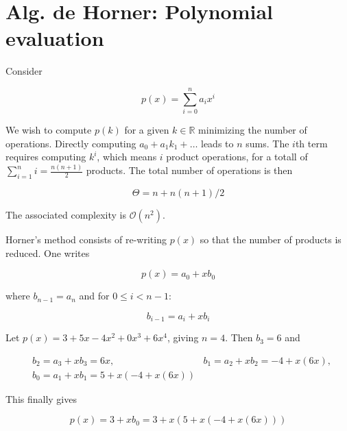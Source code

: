\documentclass[12pt]{article}
\theoremstyle{definition}
\begin{document}
\pagebreak

\section{Alg. de Horner: Polynomial evaluation} 

Consider 

\begin{equation*}
    p(x) = \sum_{i=0}^n a_ix^i
\end{equation*}

We wish to compute $p(k)$ for a given $k \in \mathbb{R}$ minimizing the number
of operations. Directly computing $a_0 + a_1k_1 + \ldots$ leads to $n$ sums. The
$i$th term requires computing $k^i$, which means $i$ product operations, for a
totall of $\sum_{i=1}^n i = \frac{n(n+1)}{2}$ products.  The total number of
operations is then 

\begin{equation*}
    \Theta = n + n(n+1) / 2
\end{equation*}

The associated complexity is $\mathcal{O}(n^2)$. 

Horner's method consists of re-writing $p(x)$ so that the number of products is
reduced. One writes 

\begin{equation*}
    p(x) = a_0 + x b_0
\end{equation*}

where $b_{n-1} = a_n$ and for $0 \leq i < n - 1$:

\begin{equation*}
    b_{i-1} = a_{i} + xb_{i}
\end{equation*}

\begin{shaded}
    \begin{example}
        \normalfont
        Let $p(x) = 3 + 5x -4x^2 + 0x^3 + 6x^4$, giving $n = 4$. Then 
        $b_{3} = 6$ and 

        \begin{align*}
            &b_2 = a_3 + xb_3 = 6x,  &b_1 = a_2 + xb_2 = -4 + x(6x),\\
            &b_0 = a_1 + xb_1 = 5 + x(-4+x(6x)) 
        \end{align*}

        This finally gives

        \begin{equation*}
            p(x) = 3 + xb_0 = 3+x(5 +
            x(-4+x(6x)))
        \end{equation*}
    \end{example}
\end{shaded}
\end{document}
